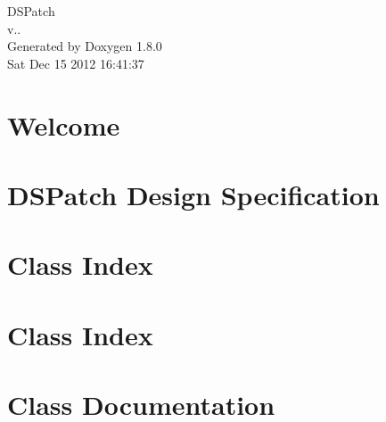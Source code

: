 \documentclass{book}
\begin{document}
\begin{titlepage}
\vspace*{7cm}
\begin{center}
{\Large D\-S\-Patch \\[1ex]\large v.. }\\
\vspace*{1cm}
{\large Generated by Doxygen 1.8.0}\\
\vspace*{0.5cm}
{\small Sat Dec 15 2012 16:41:37}\\
\end{center}
\end{titlepage}
\clearemptydoublepage
{}
\tableofcontents
\clearemptydoublepage
{}
\chapter{Welcome}
\label{index}
\chapter{D\-S\-Patch Design Specification}
\label{spec_page}

\chapter{Class Index}

\chapter{Class Index}

\chapter{Class Documentation}













\printindex
\end{document}
